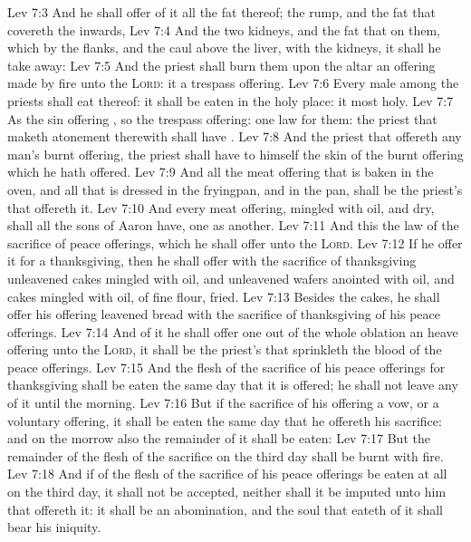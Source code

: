 \vs Lev 7:3 And he shall offer of it all the fat thereof; the rump, and the fat that covereth the inwards,
\vs Lev 7:4 And the two kidneys, and the fat that  on them, which  by the flanks, and the caul  above the liver, with the kidneys, it shall he take away:
\vs Lev 7:5 And the priest shall burn them upon the altar  an offering made by fire unto the \textsc{Lord}: it  a trespass offering.
\vs Lev 7:6 Every male among the priests shall eat thereof: it shall be eaten in the holy place: it  most holy.
\vs Lev 7:7 As the sin offering , so  the trespass offering:  one law for them: the priest that maketh atonement therewith shall have .
\vs Lev 7:8 And the priest that offereth any man's burnt offering,  the priest shall have to himself the skin of the burnt offering which he hath offered.
\vs Lev 7:9 And all the meat offering that is baken in the oven, and all that is dressed in the fryingpan, and in the pan, shall be the priest's that offereth it.
\vs Lev 7:10 And every meat offering, mingled with oil, and dry, shall all the sons of Aaron have, one  as another.
\vs Lev 7:11 And this  the law of the sacrifice of peace offerings, which he shall offer unto the \textsc{Lord}.
\vs Lev 7:12 If he offer it for a thanksgiving, then he shall offer with the sacrifice of thanksgiving unleavened cakes mingled with oil, and unleavened wafers anointed with oil, and cakes mingled with oil, of fine flour, fried.
\vs Lev 7:13 Besides the cakes, he shall offer  his offering leavened bread with the sacrifice of thanksgiving of his peace offerings.
\vs Lev 7:14 And of it he shall offer one out of the whole oblation  an heave offering unto the \textsc{Lord},  it shall be the priest's that sprinkleth the blood of the peace offerings.
\vs Lev 7:15 And the flesh of the sacrifice of his peace offerings for thanksgiving shall be eaten the same day that it is offered; he shall not leave any of it until the morning.
\vs Lev 7:16 But if the sacrifice of his offering  a vow, or a voluntary offering, it shall be eaten the same day that he offereth his sacrifice: and on the morrow also the remainder of it shall be eaten:
\vs Lev 7:17 But the remainder of the flesh of the sacrifice on the third day shall be burnt with fire.
\vs Lev 7:18 And if  of the flesh of the sacrifice of his peace offerings be eaten at all on the third day, it shall not be accepted, neither shall it be imputed unto him that offereth it: it shall be an abomination, and the soul that eateth of it shall bear his iniquity.
